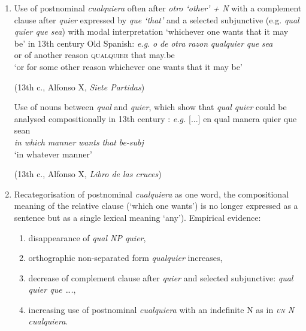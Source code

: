   \begin{enumerate}[label=\arabic*., leftmargin=2em]
    \item Use of postnominal \textit{cualquiera} often after \textit{otro ‘other’ + N} with a complement clause after \textit{quier} expressed by \textit{que ‘that’} and a selected subjunctive (e.g. \textit{qual quier que sea}) with modal interpretation ‘whichever one wants that it may be’ in 13th century Old Spanish:
    \ea 
        \gll \textit{e.g.} \textit{o} \textit{de} \textit{otra} \textit{razon} \textit{qualquier} \textit{que} \textit{sea}\\
        {} or of another reason \textsc{qualquier} that may.be\\
        \glt ‘or for some other reason whichever one wants that it may be’ 
        
        (13th c., Alfonso X, \textit{Siete Partidas})
    \z 
    
    Use of nouns between \textit{qual} and \textit{quier}, which show that \textit{qual quier} could be analysed compositionally in 13th century \citep{Pato2012}:
    \ea
        \gll \textit{e.g.} {[...]} {en} {qual} {manera} {quier} {que} {sean} \\
        {} {} \textit{in} \textit{which} \textit{manner} \textit{wants} \textit{that} \textit{be-subj} \\
        \glt ‘in whatever manner’ 
        
        (13th c., Alfonso X, \textit{Libro de las cruces})
    \z

    \item Recategorisation of postnominal \textit{cualquiera} as one word, the compositional meaning of the relative clause (‘which one wants’) is no longer expressed as a sentence but as a single lexical meaning ‘any’). Empirical evidence: 
    \begin{enumerate}[label=\alph*), leftmargin=1.5em]
        \item disappearance of \textit{qual NP quier}, 
        \item orthographic non-separated form \textit{qualquier} increases, 
        \item decrease of complement clause after \textit{quier} and selected subjunctive: \textit{qual quier que ….}, 
        \item increasing use of postnominal \textit{cualquiera} with an indefinite N as in \textit{\textsc{un} N cualquiera}.
    \end{enumerate}


\end{enumerate}
